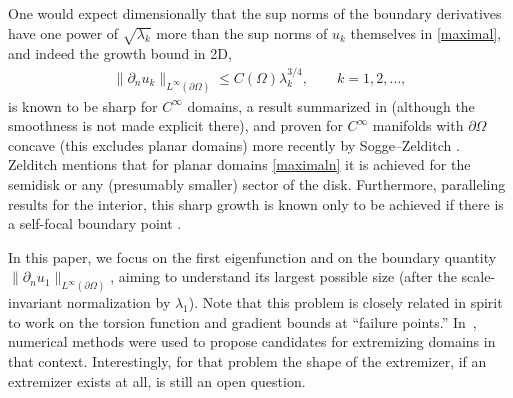 \documentclass{amsart}
\newcommand{\pO}{{\partial\Omega}}
\theoremstyle{plain}
\begin{document}
One would expect dimensionally that the sup norms of the boundary derivatives
have one power of $\sqrt{\lambda_k}$ more than the sup norms of $u_k$ themselves
in \eqref{maximal},
and indeed the growth bound in 2D,
\begin{align}
  \|\partial_n u_k\|_{L^\infty(\pO)} \le C(\Omega) \lambda_k^{3/4},
  \qquad k=1,2,\dots,
  \label{maximaln}
\end{align}
is known to be sharp for $C^\infty$ domains,
a result summarized in \cite[Cor.~2.1]{Z03}
(although the smoothness is not made explicit there),
and proven for $C^\infty$ manifolds with $\pO$ concave
(this excludes planar domains) more recently by Sogge--Zelditch \cite[Cor.~1.2]{SZ17}.
Zelditch \cite[\S5.4]{Z03} mentions that
for planar domains \eqref{maximaln} it is achieved for the semidisk
or any (presumably smaller) sector of the disk.
Furthermore, paralleling results for the interior,
this sharp growth is known only to be achieved if there is a self-focal
boundary point \cite{Z03,SZ17}.

In this paper, we focus on the first eigenfunction and on the boundary quantity $\|\partial_n u_1\|_{L^\infty(\partial\Omega)}$, aiming to understand its largest possible size (after the scale-invariant normalization by $\lambda_1$).
Note that this problem is closely related in spirit to work on the torsion function and gradient bounds at ``failure points.'' In~\cite{hoskins2021towards}, numerical methods were used to propose candidates for extremizing domains in that context. Interestingly, for that problem the shape of the extremizer, if an extremizer exists at all, is still an open question.
\end{document}
